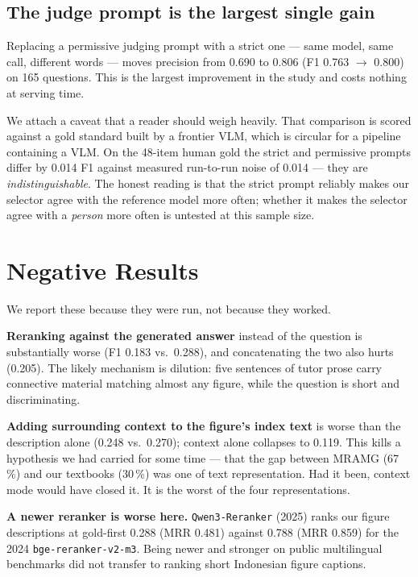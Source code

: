 \documentclass[journal]{IEEEtran}
\begin{document}
\subsection{The judge prompt is the largest single gain}

Replacing a permissive judging prompt with a strict one --- same model, same call,
different words --- moves precision from 0.690 to 0.806 (F1 0.763 $\to$ 0.800) on
165 questions. This is the largest improvement in the study and costs nothing at
serving time.

We attach a caveat that a reader should weigh heavily. That comparison is scored
against a gold standard built by a frontier VLM, which is circular for a pipeline
containing a VLM. On the 48-item human gold the strict and permissive prompts
differ by 0.014 F1 against measured run-to-run noise of 0.014 --- they are
\emph{indistinguishable}. The honest reading is that the strict prompt reliably
makes our selector agree with the reference model more often; whether it makes the
selector agree with a \emph{person} more often is untested at this sample size.

\section{Negative Results}

We report these because they were run, not because they worked.

\textbf{Reranking against the generated answer} instead of the question is
substantially worse (F1 0.183 vs.\ 0.288), and concatenating the two also hurts
(0.205). The likely mechanism is dilution: five sentences of tutor prose carry
connective material matching almost any figure, while the question is short and
discriminating.

\textbf{Adding surrounding context to the figure's index text} is worse than the
description alone (0.248 vs.\ 0.270); context alone collapses to 0.119. This kills
a hypothesis we had carried for some time --- that the gap between MRAMG (67\,\%)
and our textbooks (30\,\%) was one of text representation. Had it been, context
mode would have closed it. It is the worst of the four representations.

\textbf{A newer reranker is worse here.} \texttt{Qwen3-Reranker} (2025) ranks our
figure descriptions at gold-first 0.288 (MRR 0.481) against 0.788 (MRR 0.859) for
the 2024 \texttt{bge-reranker-v2-m3}. Being newer and stronger on public
multilingual benchmarks did not transfer to ranking short Indonesian figure
captions.
\end{document}
